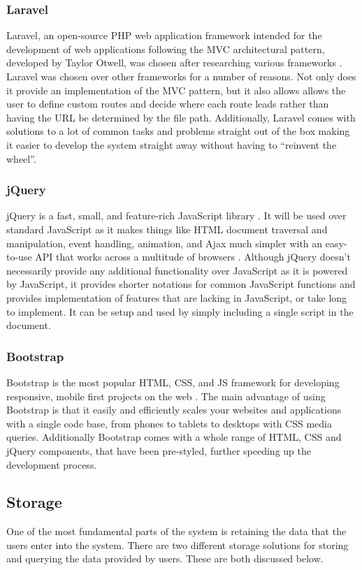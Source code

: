 \subsubsection{Laravel}
Laravel, an open-source PHP web application framework intended for the development of web applications following the MVC architectural pattern, developed by Taylor Otwell, was chosen after researching various frameworks \cite{Laravel:Home}. Laravel was chosen over other frameworks for a number of reasons. Not only does it provide an implementation of the MVC pattern, but it also allows allows the user to define custom routes and decide where each route leads rather than having the URL be determined by the file path. Additionally, Laravel comes with solutions to a lot of common tasks and problems straight out of the box making it easier to develop the system straight away without having to ``reinvent the wheel''.

\subsubsection{jQuery} 
jQuery is a fast, small, and feature-rich JavaScript library \cite{jQuery:Home}. It will be used over standard JavaScript as it makes things like HTML document traversal and manipulation, event handling, animation, and Ajax much simpler with an easy-to-use API that works across a multitude of browsers \cite{jQuery:Home}. Although jQuery doesn't necessarily provide any additional functionality over JavaScript as it is powered by JavaScript, it provides shorter notations for common JavaScript functions and provides implementation of features that are lacking in JavaScript, or take long to implement. It can be setup and used by simply including a single script in the document.

\subsubsection{Bootstrap} 
Bootstrap is the most popular HTML, CSS, and JS framework for developing responsive, mobile first projects on the web \cite{Bootstrap:Home}. The main advantage of using Bootstrap is that it easily and efficiently scales your websites and applications with a single code base, from phones to tablets to desktops with CSS media queries. Additionally Bootstrap comes with a whole range of HTML, CSS and jQuery components, that have been pre-styled, further speeding up the development process.

\subsection{Storage}
One of the most fundamental parts of the system is retaining the data that the users enter into the system. There are two different storage solutions for storing and querying the data provided by users. These are both discussed below.


